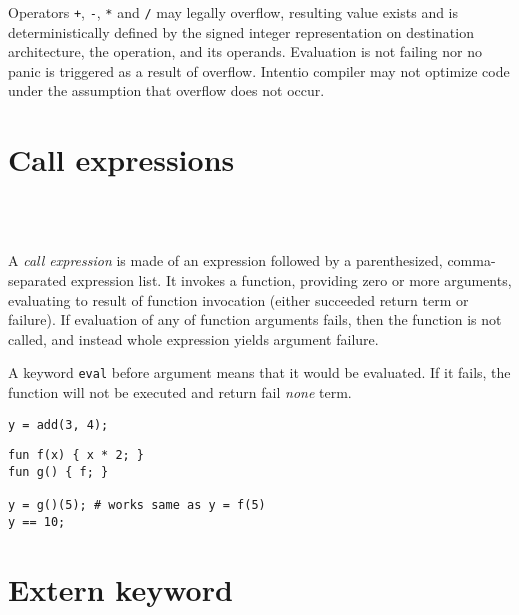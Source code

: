 Operators \lstinline{+}, \lstinline{-}, \lstinline{*} and \lstinline{/} may legally overflow, resulting value exists and is deterministically defined by the signed integer representation on destination architecture, the operation, and its operands. Evaluation is not failing nor no panic is triggered as a result of overflow. Intentio compiler may not optimize code under the assumption that overflow does not occur.

\section{Call expressions}

\begin{bnf}
   \eq {} \ \term{(} \  \ \term{)} \\
   \eq {} \  \  \ \gtry{\term{,}}
\end{bnf}

A \emph{call expression} is made of an expression followed by a parenthesized, comma-separated expression list. It invokes a function, providing zero or more arguments, evaluating to result of function invocation (either succeeded return term or failure). If evaluation of any of function arguments fails, then the function is not called, and instead whole expression yields argument failure.

A keyword \lstinline{eval} before argument means that it would be evaluated. If it fails, the function will not be executed and return fail \emph{none} term.

\begin{example}
\begin{lstlisting}
y = add(3, 4);
\end{lstlisting}
\end{example}

\begin{example}
\begin{lstlisting}[mathescape=true]
fun f(x) { x * 2; }
fun g() { f; }

y = g()(5); # works same as y = f(5)
y == 10;
\end{lstlisting}
\end{example}

\section{Extern keyword}

